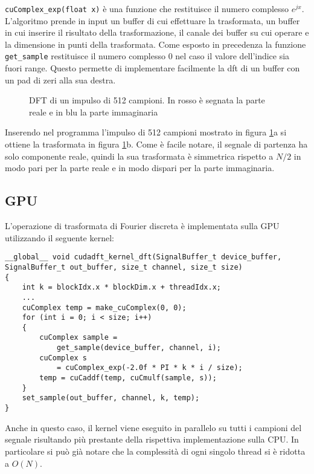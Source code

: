 \lstinline{cuComplex_exp(float x)} è una funzione che restituisce il numero complesso $e^{jx}$. L'algoritmo prende in input un buffer di cui effettuare la trasformata, un buffer in cui inserire il risultato della trasformazione, il canale dei buffer su cui operare e la dimensione in punti della trasformata. Come esposto in precedenza la funzione \lstinline{get_sample} restituisce il numero complesso $0$ nel caso il valore dell'indice sia fuori range. Questo permette di implementare facilmente la dft di un buffer con un pad di zeri alla sua destra.

\begin{figure}[h]
    \centering
    \caption{DFT di un impulso di 512 campioni. In rosso è segnata la parte reale e in blu la parte immaginaria}
    \label{fig:pulse512}
\end{figure}

Inserendo nel programma l'impulso di 512 campioni mostrato in figura \ref{fig:pulse512}a si ottiene la trasformata in figura \ref{fig:pulse512}b. Come è facile notare, il segnale di partenza ha solo componente reale, quindi la sua trasformata è simmetrica rispetto a $N/2$ in modo pari per la parte reale e in modo dispari per la parte immaginaria.

\subsection{GPU}
L'operazione di trasformata di Fourier discreta è implementata sulla GPU utilizzando il seguente kernel:

\begin{lstlisting}
__global__ void cudadft_kernel_dft(SignalBuffer_t device_buffer, SignalBuffer_t out_buffer, size_t channel, size_t size)
{
    int k = blockIdx.x * blockDim.x + threadIdx.x;
    ...
    cuComplex temp = make_cuComplex(0, 0);
    for (int i = 0; i < size; i++)
    {
        cuComplex sample =
            get_sample(device_buffer, channel, i);
        cuComplex s
            = cuComplex_exp(-2.0f * PI * k * i / size);
        temp = cuCaddf(temp, cuCmulf(sample, s));
    }
    set_sample(out_buffer, channel, k, temp);
}

\end{lstlisting}

Anche in questo caso, il kernel viene eseguito in parallelo su tutti i campioni del segnale risultando più prestante della rispettiva implementazione sulla CPU. In particolare si può già notare che la complessità di ogni singolo thread si è ridotta a $O(N)$.

